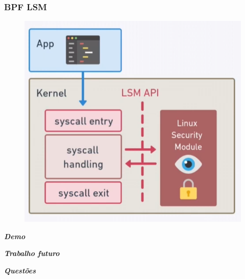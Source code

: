 \documentclass[pdflatex,compress]{beamer}
\begin{document}
\begin{frame}
\frametitle{BPF LSM}


\begin{figure}[x]
\includegraphics[scale=0.25]{lsm2.png}
\centering
\end{figure}

\end{frame}





\begin{frame}{}
  \centering \Huge
  \textbf{\emph{Demo}}
\end{frame}

\begin{frame}{}
  \centering \Huge
  \textbf{\emph{Trabalho futuro}}
\end{frame}

\begin{frame}{}
  \centering \Huge
  \textbf{\emph{Questões}}
\end{frame}
\end{document}
